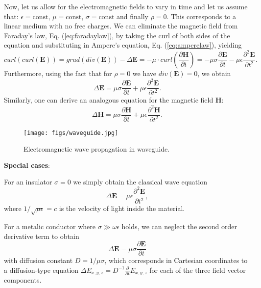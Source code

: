 Now, let us allow for the electromagnetic fields to vary in time and let us
assume that: $\epsilon=\text{const}$, $\mu=\text{const}$, $\sigma
=\text{const}$ and finally $\rho=0$. This corresponds to a linear medium with
no free charges. We can eliminate the magnetic field from Faraday's law, Eq.
(\ref{eq:faradaylaw}), by taking the curl of both sides of the equation and
substituting in Ampere's equation, Eq. (\ref{eq:amperelaw}), yielding
\[
curl(curl\left(  \mathbf{E}\right)  )=grad(div\left(  \mathbf{E}\right)
)-\Delta\mathbf{E}=-\mu\cdot curl\left(  \frac{\partial\mathbf{H}}{\partial
t}\right)  =-\mu\sigma\frac{\partial\mathbf{E}}{\partial t}-\mu\epsilon
\frac{\partial^{2}\mathbf{E}}{\partial t^{2}}.
\]
Furthermore, using the fact that for $\rho=0$ we have $div\left(
\mathbf{E}\right)  =0$, we obtain
\begin{equation}
\Delta\mathbf{E}=\mu\sigma\frac{\partial\mathbf{E}}{\partial t}+\mu
\epsilon\frac{\partial^{2}\mathbf{E}}{\partial t^{2}}.
\label{eq:electricwavebase}%
\end{equation}
Similarly, one can derive an analogous equation for the magnetic field
$\mathbf{H}$:
\begin{equation}
\Delta\mathbf{H}=\mu\sigma\frac{\partial\mathbf{H}}{\partial t}+\mu
\epsilon\frac{\partial^{2}\mathbf{H}}{\partial t^{2}}.
\label{eq:magneticwavebase}%
\end{equation}
\newline \begin{figure}[ptbh]
\centering\texttt{[image: figs/waveguide.jpg]}%
\caption{Electromagnetic wave propagation in waveguide.}%
\label{fig:wave}%
\end{figure}\newline \textbf{Special cases}:\newline 

For an insulator $\sigma=0$ we simply obtain the classical wave equation
\[
\Delta\mathbf{E}=\mu\epsilon\frac{\partial^{2}\mathbf{E}}{\partial t^{2}},
\]
where $1/\sqrt{\mu\epsilon}=c$ is the velocity of light inside the material. \newline 

For a metalic conductor where $\sigma\gg\omega\epsilon$ holds, we can neglect
the second order derivative term to obtain
\begin{equation}
\Delta\mathbf{E}=\mu\sigma\frac{\partial\mathbf{E}}{\partial t}%
\end{equation}
with diffusion constant $D=1/\mu\sigma$, which corresponds in Cartesian
coordinates to a diffusion-type equation $\Delta E_{x,y,z}=D^{-1}%
\frac{\partial}{\partial t}E_{x,y,z}$ for each of the three field vector components.

